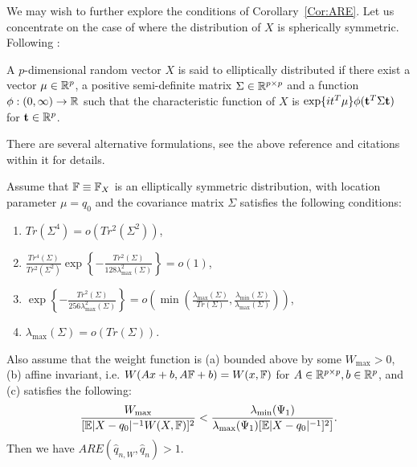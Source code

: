 We may wish to further explore the conditions of Corollary~\ref{Cor:ARE}. 
Let us concentrate on the case of where the distribution of $X$ is spherically symmetric. Following \cite{ref:Fangetal90_Book}:

\begin{Definition}
A $p$-dimensional random vector $X$ is said to elliptically distributed if there exist a vector $\mu \in {\mathbb{R}}^p$, a positive semi-definite matrix $\Sigma \in {\mathbb{R}}^{p \times p}$ and a function 
$\phi: (0, \infty) \rightarrow {\mathbb{R}}$ such that the characteristic function of $X$ is $\exp \{ i t^{T} \mu \} \phi ({\bf{t}}^T \Sigma {\bf{t}})$ for ${\bf{t}} \in {\mathbb{R}}^p$.
\end{Definition}

There are several alternative formulations, see the above reference and citations within it for details.

\begin{Corollary}\label{Cor:Elliptic_ARE}
Assume that ${\mathbb{F}} \equiv {\mathbb{F}}_X$ is an elliptically symmetric distribution, with location parameter $\mu = q_{0}$ and the covariance matrix $\Sigma$ satisfies the following conditions:
%
\begin{enumerate}
\item $Tr(\Sigma^4) = o( Tr^2 (\Sigma^2) )$,

\item $\frac{Tr^4(\Sigma)}{ Tr^2 (\Sigma^2)} \exp \left\{ - \frac{Tr^2 (\Sigma)}
{ 128 \lambda_{\max}^2 (\Sigma)} \right\} = o(1)$,

\item $\exp \left\{ - \frac{Tr^2 (\Sigma)}{ 256 \lambda_{\max}^2 (\Sigma)} \right\} = 
o\left( \min\left( \frac{\lambda_{\max}(\Sigma) }{Tr( \Sigma)},
\frac{\lambda_{\min}(\Sigma)}{\lambda_{\max}(\Sigma)} \right) \right)$,

\item $\lambda_{\max}(\Sigma) = o( Tr(\Sigma))$.
\end{enumerate}

Also assume that the weight function is (a) bounded above by some $W_{\max} > 0$, (b) affine invariant, i.e. $ W (Ax + b, A{\mathbb{F}} + b) = W (x, {\mathbb{F}})$ for $A \in {\mathbb{R}}^{p \times p}, b \in {\mathbb{R}}^p$, and (c) satisfies the following:
%
\begin{equation}\label{eqn:CorElliptic_ARE_eqn}
\frac{W_{\max}}{[ \BE | X - q_0|^{-1} W(X, \BF)]^2 } <
\frac{\lambda_{\min} (\Psi_1)}{\lambda_{\max} (\Psi_1) [ \BE | X - q_0|^{-1}]^2]}.
\end{equation}
%
Then we have $ARE( \hat q_{n,W}, \hat q_n) > 1$.
\end{Corollary}

